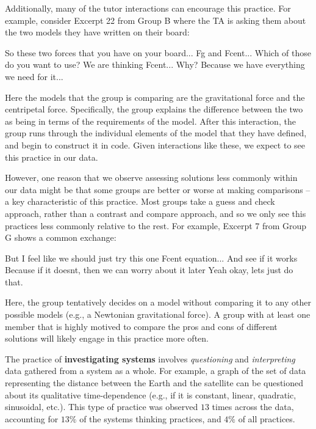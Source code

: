 \documentclass{msuphddissertation}
\begin{document}
\begin{doublespace}
Additionally, many of the tutor interactions can encourage this practice.  For example, consider Excerpt 22 from Group B where the TA is asking them about the two models they have written on their board:\begin{description}
\TA So these two forces that you have on your board...
\TA Fg and Fcent...
\TA Which of those do you want to use?
\SB We are thinking Fcent...
\TA Why?
\SB Because we have everything we need for it...
\end{description}  Here the models that the group is comparing are the gravitational force and the centripetal force.  Specifically, the group explains the difference between the two as being in terms of the requirements of the model.  After this interaction, the group runs through the individual elements of the model that they have defined, and begin to construct it in code.  Given interactions like these, we expect to see this practice in our data.

However, one reason that we observe assessing solutions less commonly within our data might be that some groups are better or worse at making comparisons -- a key characteristic of this practice.  Most groups take a guess and check approach, rather than a contrast and compare approach, and so we only see this practices less commonly relative to the rest.  For example, Excerpt 7 from Group G shows a common exchange: \begin{description}
\SC But I feel like we should just try this one {Fcent equation}...
\SC And see if it works
\SC Because if it doesnt, then we can worry about it {later}
\SB Yeah okay, lets just do that.
\end{description}  Here, the group tentatively decides on a model without comparing it to any other possible models (e.g., a Newtonian gravitational force).  A group with at least one member that is highly motived to compare the pros and cons of different solutions will likely engage in this practice more often.  %

%
%
%

The practice of \textbf{investigating systems} involves \textit{questioning} and \textit{interpreting} data gathered from a system as a whole.  For example, a graph of the set of data representing the distance between the Earth and the satellite can be questioned about its qualitative time-dependence (e.g., if it is constant, linear, quadratic, sinusoidal, etc.).  This type of practice was observed $13$ times across the data, accounting for $13\%$ of the systems thinking practices, and $4\%$ of all practices.


\end{doublespace}
\end{document}
